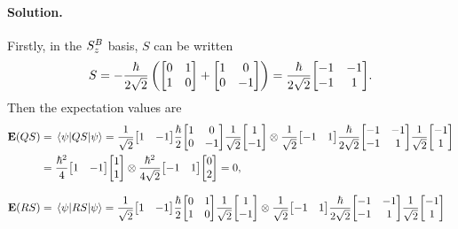 \documentclass[11pt]{article}
\newcommand{\refeq}[1]{(\ref{#1})}
\newcommand{\beq}{\begin{equation*}}
\newcommand{\eeq}{\end{equation*}}
\newenvironment{solution}
{
	\paragraph{Solution.}
}
{
	\bigskip
}
\begin{document}
\begin{solution}
	Firstly, in the $S_z^B$ basis, $S$ can be written
	\beq
		S = -\frac{\hbar}{2 \sqrt{2}} \left( \mqty[ 0 & 1 \\ 1 & 0 ] + \mqty[ 1 & 0 \\ 0 & -1 ] \right)
		= \frac{\hbar}{2 \sqrt{2}} \mqty[ -1 & -1 \\ -1 & 1 ].
	\eeq
%	
	Then the expectation values are
	\begin{align*}
		\vE(QS) &= \ev{Q S}{\psi}
		= \frac{1}{\sqrt{2}} \mqty[ 1 & -1 ] \frac{\hbar}{2} \mqty[ 1 & 0 \\ 0 & -1 ] \frac{1}{\sqrt{2}} \mqty[ 1 \\ -1 ] \otimes \frac{1}{\sqrt{2}} \mqty[ -1 & 1 ] \frac{\hbar}{2 \sqrt{2}} \mqty[ -1 & -1 \\ -1 & 1 ] \frac{1}{\sqrt{2}} \mqty[ -1 \\ 1 ] \\
		&= \frac{\hbar^2}{4} \mqty[ 1 & -1 ] \mqty[ 1 \\ 1 ] \otimes \frac{\hbar^2}{4 \sqrt{2}} \mqty[ -1 & 1 ] \mqty[ 0 \\ 2 ]
		= 0, \\[2ex]
		\vE(RS) &= \ev{R S}{\psi}
		= \frac{1}{\sqrt{2}} \mqty[ 1 & -1 ] \frac{\hbar}{2} \mqty[ 0 & 1 \\ 1 & 0 ] \frac{1}{\sqrt{2}} \mqty[ 1 \\ -1 ] \otimes \frac{1}{\sqrt{2}} \mqty[ -1 & 1 ] \frac{\hbar}{2 \sqrt{2}} \mqty[ -1 & -1 \\ -1 & 1 ] \frac{1}{\sqrt{2}} \mqty[ -1 \\ 1 ] \\

\end{align*}
\end{solution}
\end{document}
